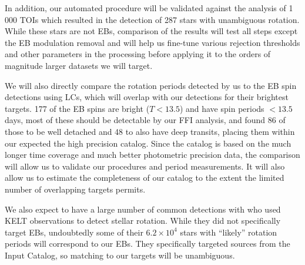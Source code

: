 In addition, our automated procedure will be validated against the
\citep{CantoMartins_et_al_20} analysis of 1\,000 TOIs which resulted in the
detection of 287 stars with unambiguous rotation. While these stars are not EBs,
comparison of the results will test all steps except the EB modulation removal
and will help us fine-tune various rejection thresholds and other parameters in
the processing before applying it to the orders of magnitude larger datasets we
will target.

We will also directly compare the rotation periods detected by us to the
\citep{Lurie_et_al_17} EB spin detections using \kepler{} LCs, which will
overlap with our detections for their brightest targets. 177 of the
\citep{Lurie_et_al_17} EB spins are bright ($T<13.5$) and have spin periods
$<13.5$\,days, most of these should be detectable by our FFI analysis, and
\citep{Prsa_et_al_22} found 86 of those to be well detached and 48 to also have
deep transits, placing them within our expected the high precision catalog.
Since the \citep{Lurie_et_al_17} catalog is based on the much longer time
coverage and much better photometric precision \kepler{} data, the comparison
will allow us to validate our procedures and period measurements. It will also
allow us to estimate the completeness of our catalog to the extent the limited
number of overlapping targets permits.

We also expect to have a large number of common detections with
\citep{Oelkers_et_al_18} who used KELT observations to detect stellar rotation.
While they did not specifically target EBs, undoubtedly some of their
$6.2\times10^4$ stars with ``likely'' rotation periods will correspond to our
EBs. They specifically targeted sources from the \tess{} Input Catalog, so
matching to our targets will be unambiguous.
